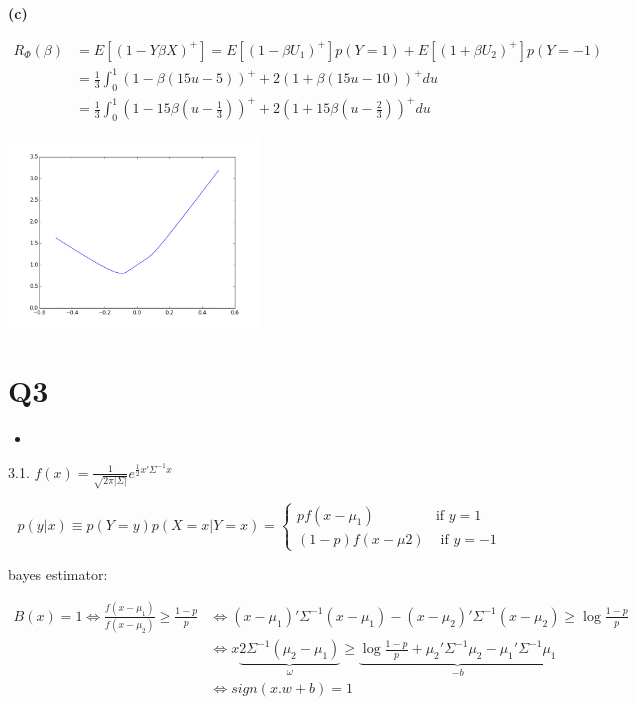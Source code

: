 \documentclass[11pt]{article}
\begin{document}
\textbf{(c)}

\begin{align*}
R_{\Phi}(\beta)
&= E[(1 - Y\beta X)^+] = E[(1 - \beta U_1)^+] p(Y = 1) +  E[(1 + \beta U_2)^+] p(Y = -1)
\\&= \frac13 \int_0^1 (1 - \beta (15 u - 5))^+ + 2 (1 + \beta (15 u - 10))^+ du
\\&= \frac13 \int_0^1 (1 - 15 \beta (u - \frac13))^+ + 2 (1 + 15 \beta ( u - \frac23))^+ du
\end{align*}

\begin{org}
\begin{center}
\includegraphics[width=0.5\textwidth]{img/hingerisk.png}
\end{center}
\end{org}


\section{Q3}
\label{sec:orgheadline3}

\begin{itemize}
\item 
\end{itemize}
3.1.
\(f(x) = \frac1{\sqrt{2\pi|\Sigma|}} e^{\frac12 x'\Sigma^{-1}x}\)

$$p(y | x) \equiv p(Y = y) p(X = x | Y = x) = \left\{\begin{array}{cc}p f(x-\mu_1) &  \text{if } y = 1\\(1-p) f(x-\mu2) & \text{ if } y = -1\end{array}\right.$$

bayes estimator:

\begin{align*}
B(x) = 1 \iff \frac{f(x - \mu_1)}{f(x - \mu_2)} \ge \frac{1-p}p 
& \iff (x-\mu_1)'\Sigma^{-1}(x-\mu_1) - (x-\mu_2)'\Sigma^{-1}(x-\mu_2) \ge \log\frac{1-p}p \\
& \iff x \underbrace{2\Sigma^{-1}(\mu_2 - \mu_1)}_{\omega} \ge \underbrace{\log\frac{1-p}p + \mu_2'\Sigma^{-1}\mu_2 - \mu_1'\Sigma^{-1}\mu_1}_{-b} \\
& \iff sign(x.w + b) = 1
\end{align*}
\end{document}
